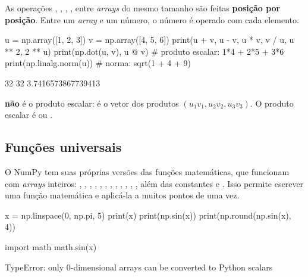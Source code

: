 As operações \py{+}, \py{-}, \py{*}, \py{/}, \py{**} entre \emph{arrays} do mesmo tamanho são feitas
\textbf{posição por posição}. Entre um \emph{array} e um número, o número é operado com cada elemento.

\begin{entrada}
u = np.array([1, 2, 3])
v = np.array([4, 5, 6])
print(u + v, u - v, u * v, v / u, u ** 2, 2 ** u)
print(np.dot(u, v), u @ v)       # produto escalar: 1*4 + 2*5 + 3*6
print(np.linalg.norm(u))         # norma: sqrt(1 + 4 + 9)
\end{entrada}
\begin{saida}
[5 7 9] [-3 -3 -3] [ 4 10 18] [4.  2.5 2. ] [1 4 9] [2 4 8]
32 32
3.7416573867739413
\end{saida}

\begin{atencao}
 \textbf{não} é o produto escalar: é o vetor dos produtos $(u_1v_1, u_2v_2, u_3v_3)$. O produto escalar
é  ou .
\end{atencao}

\subsection{Funções universais}

O NumPy tem suas próprias versões das funções matemáticas, que funcionam com \emph{arrays} inteiros:
, , , , , , ,
, , , , , além das constantes  e
. Isso permite escrever uma função matemática e aplicá-la a muitos pontos de uma vez.

\begin{entrada}
x = np.linspace(0, np.pi, 5)
print(x)
print(np.sin(x))
print(np.round(np.sin(x), 4))
\end{entrada}
\begin{saida}
[0.         0.78539816 1.57079633 2.35619449 3.14159265]
[0.00000000e+00 7.07106781e-01 1.00000000e+00 7.07106781e-01
 1.22464680e-16]
[0.     0.7071 1.     0.7071 0.    ]
\end{saida}

\begin{entrada}
import math
math.sin(x)
\end{entrada}
\begin{saida}
TypeError: only 0-dimensional arrays can be converted to Python scalars
\end{saida}

